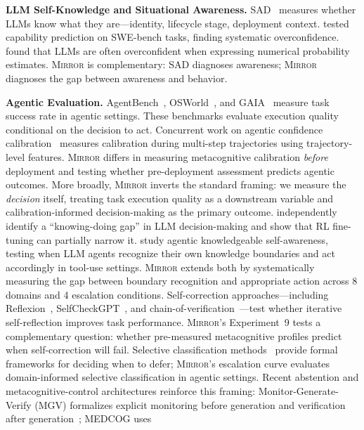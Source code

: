 \documentclass[10pt]{article}
\newcommand{\mirror}{\textsc{Mirror}}
\begin{document}
\textbf{LLM Self-Knowledge and Situational Awareness.}
SAD~\citep{laine2024me} measures whether LLMs know what they are---identity,
lifecycle stage, deployment context. \citet{barkan2025llms} tested capability
prediction on SWE-bench tasks, finding systematic overconfidence.
\citet{xiong2023can} found that LLMs are often overconfident when expressing
numerical probability estimates. \mirror{} is complementary: SAD diagnoses
awareness; \mirror{} diagnoses the gap between awareness and behavior.

\textbf{Agentic Evaluation.}
AgentBench~\citep{liu2023agentbench}, OSWorld~\citep{xie2024osworld}, and
GAIA~\citep{mialon2023gaia} measure task success rate in agentic settings. These
benchmarks evaluate execution quality conditional on the decision to act.
Concurrent work on agentic confidence calibration~\citep{htc2026} measures
calibration during multi-step trajectories using trajectory-level features.
\mirror{} differs in measuring metacognitive calibration \textit{before} deployment
and testing whether pre-deployment assessment predicts agentic outcomes. More
broadly, \mirror{} inverts the standard framing: we measure the \textit{decision}
itself, treating task execution quality as a downstream variable and
calibration-informed decision-making as the primary outcome.
\citet{schmied2026greedy} independently identify a ``knowing-doing gap'' in LLM
decision-making and show that RL fine-tuning can partially narrow it.
\citet{qiao2025agentic} study agentic knowledgeable self-awareness, testing when
LLM agents recognize their own knowledge boundaries and act accordingly in
tool-use settings. \mirror{} extends both by systematically measuring the gap
between boundary recognition and appropriate action across 8 domains and 4
escalation conditions.
Self-correction approaches---including Reflexion~\citep{shinn2023reflexion},
SelfCheckGPT~\citep{manakul2023selfcheckgpt}, and
chain-of-verification~\citep{dhuliawala2023chainofverification}---test whether
iterative self-reflection improves task performance. \mirror{}'s Experiment~9
tests a complementary question: whether pre-measured metacognitive profiles predict
when self-correction will fail. Selective classification
methods~\citep{geifman2017selective} provide formal frameworks for deciding when
to defer; \mirror{}'s escalation curve evaluates domain-informed selective
classification in agentic settings.
Recent abstention and metacognitive-control architectures reinforce this framing:
Monitor-Generate-Verify (MGV) formalizes explicit monitoring before generation
and verification after generation~\citep{oh2025mgv}; MEDCOG uses
\end{document}
